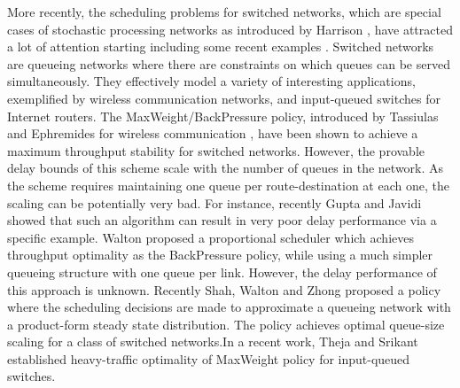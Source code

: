 \documentclass[ssy,preprint]{imsart_axv}
\numberwithin{equation}{section}
\theoremstyle{plain}
\theoremstyle{definition}
\theoremstyle{remark}
\theoremstyle{plain}
\theoremstyle{plain}
\begin{document}
More recently, the scheduling problems for switched networks, which
are special cases of stochastic processing networks as introduced
by Harrison \cite{harrison2000brownian}, have attracted a lot of
attention starting \cite{tassiulas1992maxweight} including some recent
examples \cite{walton2014concave,shah2014SFA,maguluri2015heavy}. Switched networks are 
queueing networks where there are constraints on which queues can be served 
simultaneously. They effectively model a variety of interesting applications, 
exemplified by wireless communication networks, and input-queued switches for 
Internet routers. The MaxWeight/BackPressure policy, introduced by 
Tassiulas and Ephremides for wireless communication \cite{tassiulas1992maxweight, mckeown1996achieving}, 
have been shown to achieve a maximum throughput stability for switched networks. 
However, the provable delay bounds of this scheme scale with the number of queues in the
network. As the scheme requires maintaining one queue per route-destination at each one,
the scaling can be potentially very bad. For instance, recently Gupta
and Javidi \cite{gupta2007routing} showed that such an algorithm
can result in very poor delay performance via a specific example.
Walton \cite{walton2014concave} proposed a proportional scheduler
which achieves throughput optimality as the BackPressure policy,
while using a much simpler queueing structure with one queue per link.
However, the delay performance of this approach is unknown. Recently
Shah, Walton and Zhong \cite{shah2014SFA} proposed a policy where
the scheduling decisions are made to approximate a queueing network
with a product-form steady state distribution. The policy achieves optimal
queue-size scaling for a class of switched networks.In a recent work, Theja and Srikant \cite{maguluri2015heavy} established heavy-traffic optimality of
MaxWeight policy for input-queued switches. 
\end{document}
